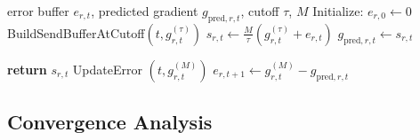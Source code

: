 \begin{algorithm}[tb]
  \caption{POLAR-SGD: Error feedback with prefix scaling}
  \label{alg:error_feedback}
  \begin{algorithmic}
     error buffer $e_{r,t}$, predicted gradient $g_{\mathrm{pred},r,t}$, cutoff $\tau$, $M$
    \STATE Initialize: $e_{r,0} \leftarrow 0$
     {BuildSendBufferAtCutoff}$(t, g_{r,t}^{(\tau)})$
    \STATE $s_{r,t} \leftarrow \frac{M}{\tau}\left(g_{r,t}^{(\tau)} + e_{r,t}\right)$
    \STATE $g_{\mathrm{pred},r,t} \leftarrow s_{r,t}$
    
    \STATE \textbf{return} $s_{r,t}$ 
     UpdateError $(t, g_{r,t}^{(M)})$
    \STATE $e_{r,t+1} \leftarrow g_{r,t}^{(M)} - g_{\mathrm{pred},r,t}$
  \end{algorithmic}
\end{algorithm}

\subsection{Convergence Analysis}






